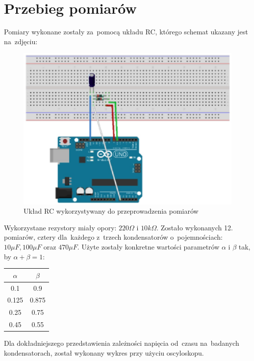 \documentclass[12pt]{mwart}
\begin{document}
	\section{Przebieg pomiarów}
	\noindent Pomiary wykonane zostały za~pomocą układu RC, którego schemat ukazany jest na~zdjęciu:
	\begin{figure}[H]
		\centering
		\includegraphics[scale = 0.5]{schemat.jpg}
		\caption{Układ RC wykorzystywany do przeprowadzenia pomiarów}
	\end{figure}
	\noindent Wykorzystane rezystory miały opory: $220\Omega$ i $10k\Omega$.
	Zostało wykonanych 12. pomiarów, cztery dla~każdego z~trzech kondensatorów o~pojemnościach: $10\mu F, 100\mu F$ oraz $470\mu F$. Użyte zostały konkretne wartości parametrów $\alpha$ i $\beta$ tak, by $\alpha+\beta=1$:
	\begin{table}[H] %
		\centering
		\begin{tabular}{c|c}
			\hline
			$\alpha$ & $\beta$ \\ \hline
			0.1 & 0.9  \\ \hline
			0.125 & 0.875  \\ \hline
			0.25 & 0.75 \\ \hline
			0.45 & 0.55  \\ \hline
		\end{tabular}
	\end{table}
	\noindent Dla dokładniejszego przedstawienia zależności napięcia od~czasu na~badanych kondensatorach, został wykonany wykres przy użyciu oscyloskopu. %
\end{document}
